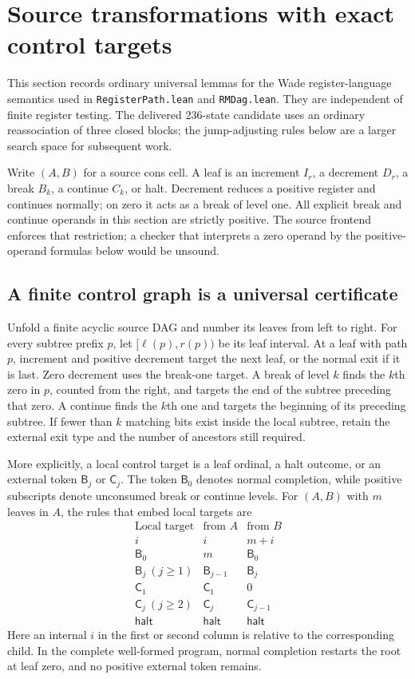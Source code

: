 \section{Source transformations with exact control targets}
\label{sec:source-rewrite-lemmas}

This section records ordinary universal lemmas for the Wade register-language
semantics used in \texttt{RegisterPath.lean} and \texttt{RMDag.lean}.  They are
independent of finite register testing.  The delivered 236-state candidate
uses an ordinary reassociation of three closed blocks; the jump-adjusting
rules below are a larger search space for subsequent work.

Write $(A,B)$ for a source cons cell.  A leaf is an increment $I_r$, a
decrement $D_r$, a break $B_k$, a continue $C_k$, or halt.  Decrement reduces
a positive register and continues normally; on zero it acts as a break of
level one.  All explicit break and continue operands in this section are
strictly positive.  The source frontend enforces that restriction; a checker
that interprets a zero operand by the positive-operand formulas below would
be unsound.

\subsection*{A finite control graph is a universal certificate}

Unfold a finite acyclic source DAG and number its leaves from left to right.
For every subtree prefix $p$, let $[\ell(p),r(p))$ be its leaf interval.
At a leaf with path $p$, increment and positive decrement target the next
leaf, or the normal exit if it is last.  Zero decrement uses the break-one
target.  A break of level $k$ finds the $k$th zero in $p$, counted from the
right, and targets the end of the subtree preceding that zero.  A continue
finds the $k$th one and targets the beginning of its preceding subtree.
If fewer than $k$ matching bits exist inside the local subtree, retain the
external exit type and the number of ancestors still required.

More explicitly, a local control target is a leaf ordinal, a halt outcome,
or an external token $\mathsf B_j$ or $\mathsf C_j$.  The token
$\mathsf B_0$ denotes normal completion, while positive subscripts denote
unconsumed break or continue levels.  For $(A,B)$ with $m$ leaves in $A$,
the rules that embed local targets are
\[
\begin{array}{c|cc}
\text{Local target}&\text{from }A&\text{from }B\\ \hline
i&i&m+i\\
\mathsf B_0&m&\mathsf B_0\\
\mathsf B_j\ (j\ge1)&\mathsf B_{j-1}&\mathsf B_j\\
\mathsf C_1&\mathsf C_1&0\\
\mathsf C_j\ (j\ge2)&\mathsf C_j&\mathsf C_{j-1}\\
\mathsf{halt}&\mathsf{halt}&\mathsf{halt}
\end{array}
\tag{C}
\]
Here an internal $i$ in the first or second column is relative to the
corresponding child.  In the complete well-formed program, normal completion
restarts the root at leaf zero, and no positive external token remains.

